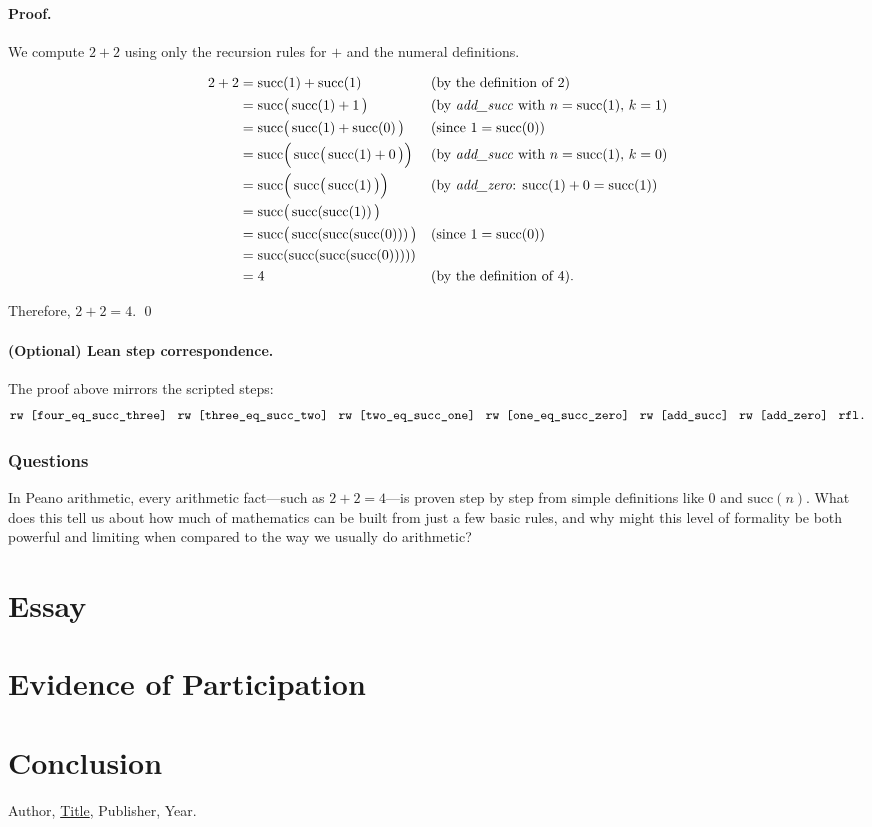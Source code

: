 \documentclass{article}
\theoremstyle{theorem}
\theoremstyle{definition}
\theoremstyle{remark}
\begin{document}
\paragraph{Proof.}
We compute $2+2$ using only the recursion rules for $+$ and the numeral definitions.

\begin{align*}
2+2
&= \mathrm{succ}(1) + \mathrm{succ}(1) && \text{(by the definition of $2$)}\\
&= \mathrm{succ}\big(\,\mathrm{succ}(1) + 1\,\big) && \text{(by \textit{add\_succ} with $n=\mathrm{succ}(1),\,k=1$)}\\
&= \mathrm{succ}\big(\,\mathrm{succ}(1) + \mathrm{succ}(0)\,\big) && \text{(since $1=\mathrm{succ}(0)$)}\\
&= \mathrm{succ}\Big(\,\mathrm{succ}\big(\,\mathrm{succ}(1) + 0\,\big)\Big) && \text{(by \textit{add\_succ} with $n=\mathrm{succ}(1),\,k=0$)}\\
&= \mathrm{succ}\Big(\,\mathrm{succ}\big(\,\mathrm{succ}(1)\,\big)\Big) && \text{(by \textit{add\_zero}: $\mathrm{succ}(1)+0=\mathrm{succ}(1)$)}\\
&= \mathrm{succ}\big(\,\mathrm{succ}(\mathrm{succ}(1))\,\big)\\
&= \mathrm{succ}\big(\,\mathrm{succ}(\mathrm{succ}(\mathrm{succ}(0)))\,\big) && \text{(since $1=\mathrm{succ}(0)$)}\\
&= \mathrm{succ}(\mathrm{succ}(\mathrm{succ}(\mathrm{succ}(0)))))\\
&= 4 && \text{(by the definition of $4$).}
\end{align*}

Therefore, $2+2=4$.
\qed

\paragraph{(Optional) Lean step correspondence.}
The proof above mirrors the scripted steps:
\[
\texttt{rw [four\_eq\_succ\_three]\; rw [three\_eq\_succ\_two]\; rw [two\_eq\_succ\_one]\; rw [one\_eq\_succ\_zero]\; rw [add\_succ]\; rw [add\_zero]\; rfl.}
\]

\subsubsection{Questions}
In Peano arithmetic, every arithmetic fact—such as $2+2=4$—is proven step by step from simple definitions like $0$ and $\mathrm{succ}(n)$. 
What does this tell us about how much of mathematics can be built from just a few basic rules, and why might this level of formality be both powerful and limiting when compared to the way we usually do arithmetic?


\section{Essay}

\section{Evidence of Participation}

\section{Conclusion}\label{conclusion}

\begin{thebibliography}{99}
 Author, \href{https://en.wikipedia.org/wiki/LaTeX}{Title}, Publisher, Year.
\end{thebibliography}
\end{document}
